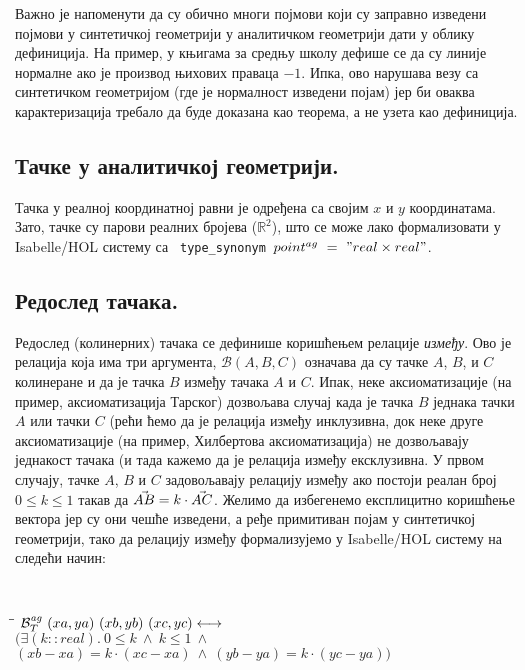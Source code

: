 Важно је напоменути да су обично многи појмови који су заправно
изведени појмови у синтетичкој геометрији у аналитичком геометрији
дати у облику дефиниција. На пример, у књигама за средњу школу дефише
се да су линије нормалне ако је производ њихових праваца $-1$. Ипка,
ово нарушава везу са синтетичком геометријом (где је нормалност
изведени појам) јер би оваква карактеризација требало да буде доказана
као теорема, а не узета као дефиниција.

\subsection{Тачке у аналитичкој геометрији.}
Тачка у реалној координатној равни је одређена са својим $x$ и $y$
координатама. Зато, тачке су парови реалних бројева ($\mathbb{R}^2$),
што се може лако формализовати у Isabelle/HOL систему са {\tt
  type\_synonym\ $point^{ag}\ =\ "real \times real"$}.

\subsection{Редослед тачака.} Редослед (колинерних) тачака се
дефинише коришћењем релације \emph{између}. Ово је релација која има
три аргумента, $\mathcal{B}(A, B, C)$ означава да су тачке $A$, $B$, и
$C$ колинеране и да је тачка $B$ између тачака $A$ и $C$. Ипак, неке
аксиоматизације (на пример, аксиоматизација Тарског) дозвољава случај
када је тачка $B$ једнака тачки $A$ или тачки $C$ (рећи ћемо да је
релација између инклузивна, док неке друге аксиоматизације (на пример,
Хилбертова аксиоматизација) не дозвољавају једнакост тачака (и тада
кажемо да је релација између ексклузивна. У првом случају, тачке $A$,
$B$ и $C$ задовољавају релацију између ако постоји реалан број $0 \le
k \le 1$ такав да $\vec{AB} = k \cdot \vec{AC}$. Желимо да
избегенемо експлицитно коришћење вектора јер су они чешће изведени, а
ређе примитиван појам у синтетичкој геометрији, тако да релацију
између формализујемо у Isabelle/HOL систему на следећи начин:

{\tt
\begin{tabbing}
\hspace{5mm}\=\hspace{5mm}\=\kill
$\mathcal{B}_T^{\mathit{ag}}\ (xa, ya)\ (xb, yb)\ (xc, yc) \longleftrightarrow$\\
\>$(\exists (k::real).\ 0 \le k \ \wedge\ k \le 1 \ \wedge$\\
\>\>$(xb - xa) = k \cdot (xc - xa) \ \wedge\ (yb - ya) = k \cdot (yc - ya))$
\end{tabbing}
}

